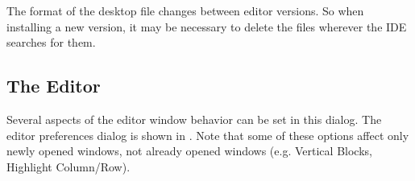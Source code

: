 \begin{remark}
The format of the desktop file changes between editor versions. So
when installing a new version, it may be necessary to delete the
 files wherever the IDE searches for them.
\end{remark}

%
%
\subsection{The Editor}
Several aspects of the editor window behavior can be set in this dialog.
The editor preferences dialog is shown in . Note that
some of these options affect only newly opened windows, not already 
opened windows (e.g. Vertical Blocks, Highlight Column/Row).


